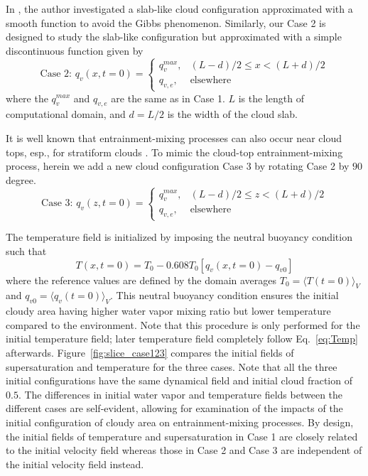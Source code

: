 \documentclass[draft,linenumbers]{agujournal}
\newcommand{\Eq}[1]{Eq.~\eqref{#1}}
\newcommand{\Fig}[1]{Figure~\ref{#1}}
\begin{document}
In \citet{Kumar11}, the author investigated a slab-like cloud configuration approximated with a smooth function to avoid the Gibbs phenomenon. Similarly, our Case 2 is designed to study the slab-like configuration but approximated with a simple discontinuous function given by
\begin{equation}
\mbox{Case 2: } q_v(x,t=0) = 
\left\{\begin{array}{lr}
q_v^{max}, & (L-d)/2 \le x < (L+d)/2\\
q_{v,e}, & \mbox{elsewhere}
\end{array}\right.\label{case2}
\end{equation}
where the $q_v^{max}$ and $q_{v,e}$ are the same as in Case 1.
$L$ is the length of computational domain, and $d = L/2$ is the width of the cloud slab.

It is well known that entrainment-mixing processes can also occur near cloud tops, esp., for stratiform clouds \citep{Lu2011, Yum2015}. To mimic the cloud-top entrainment-mixing process, herein we add a new cloud configuration Case 3 by rotating Case 2 by $90$ degree.
\begin{equation}
\mbox{Case 3: } q_v(z,t=0) = 
\left\{\begin{array}{lr}
q_v^{max}, & (L-d)/2 \le z < (L+d)/2\\
q_{v,e}, & \mbox{elsewhere}
\end{array}\right.\label{case3}
\end{equation}

The temperature field is initialized by imposing the neutral buoyancy condition such that \citep{Kumar14}
\begin{equation}
T(x,t = 0) = T_0 - 0.608T_0[q_v(x,t = 0) - q_{v0}]
\end{equation}
where the reference values are defined by the domain averages $T_0 = \langle T(t=0)\rangle_V$ and $q_{v0} = \langle q_v(t=0)\rangle_V$. This neutral buoyancy condition ensures the initial cloudy area having higher water vapor mixing ratio but lower temperature compared to the environment. Note that this procedure is only performed for the initial temperature field; later temperature field completely follow \Eq{eq:Temp} afterwards. \Fig{fig:slice_case123} compares the initial fields of  supersaturation and temperature for the three cases. {Note that all the three initial 
configurations have the same dynamical field and initial cloud fraction of $0.5$.} The differences in initial water vapor 
and temperature fields between the different cases are self-evident, allowing for examination of the impacts of the initial 
configuration of cloudy area on entrainment-mixing processes.
{By design, the initial fields of temperature and supersaturation in Case 1 are closely related to the initial velocity field whereas those in Case 2 and Case 3 are independent of the initial velocity field instead.}
\end{document}
